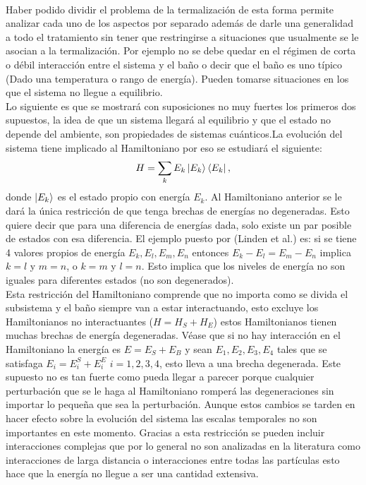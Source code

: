 \\
Haber podido dividir el problema de la termalización de esta forma permite analizar cada uno de los aspectos por separado además de darle una generalidad a todo el tratamiento sin tener que restringirse a situaciones que usualmente se le asocian a la termalización. Por ejemplo no se debe quedar en el régimen de corta o débil interacción entre el sistema y el baño o decir que el baño es uno típico (Dado una temperatura o rango de energía). Pueden tomarse situaciones en los que el sistema no llegue a equilibrio. 
\\
Lo siguiente es que se mostrará con suposiciones no muy fuertes los primeros dos supuestos, la idea de que un sistema llegará al equilibrio y que el estado no depende del ambiente, son propiedades de sistemas cuánticos.La evolución del sistema tiene implicado al Hamiltoniano por eso se estudiará el siguiente:
\begin{equation}
H= \sum_{k} E_{k} \ket{E_{k}} \bra{E_{k}},
\end{equation}
donde $\ket{E_{k}}$ es el estado propio con energía $E_{k}$. Al Hamiltoniano anterior se le dará la única restricción de que tenga brechas de energías no degeneradas. Esto quiere decir que para una diferencia de energías dada, solo existe un par posible de estados con esa diferencia. El ejemplo puesto por (Linden et al.) es: si se tiene 4 valores propios de energía $E_{k}, E_{l},E_{m},E_{n}$ entonces $E_{k}-E_{l}=E_{m}-E_{n} $ implica $k=l$ y $m=n$, o $k=m$ y $l=n$. Esto implica que los niveles de energía no son iguales para diferentes estados (no son degenerados).\\
Esta restricción del Hamiltoniano comprende que no importa como se divida el subsistema y el baño  siempre van a estar interactuando, esto excluye los Hamiltonianos no interactuantes ($H=H_{S}+H_{E}$) estos Hamiltonianos tienen muchas brechas de energía degeneradas. Véase que si no hay interacción en el Hamiltoniano la energía es $E=E_{S}+E_{B}$ y sean $E_{1},E_{2},E_{3},E_{4}$ tales que se satisfaga $E_{i}=E_{i}^{S}+E_{i}^{E}$ $i=1,2,3,4$, esto lleva a una brecha degenerada. Este supuesto no es tan fuerte como pueda llegar a parecer porque cualquier perturbación que se le haga al Hamiltoniano romperá las degeneraciones sin importar lo pequeña que sea la perturbación. Aunque estos cambios se tarden en hacer efecto sobre la evolución del sistema las escalas temporales no son importantes en este momento.  Gracias a esta restricción se pueden incluir interacciones complejas que por lo general no son analizadas en la literatura como interacciones de larga distancia o interacciones entre todas las partículas esto hace que la energía no llegue a ser una cantidad extensiva.

